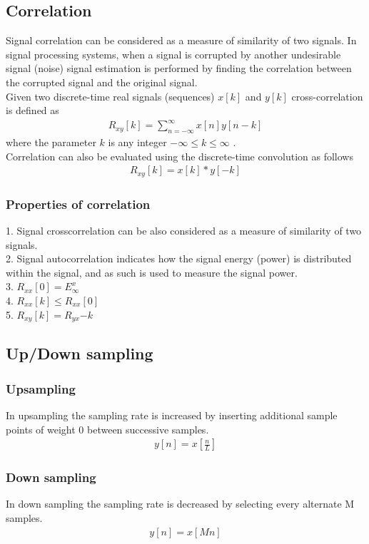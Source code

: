 \documentclass[journal,12pt,twocolumn]{IEEEtran}
\begin{document}
\subsection{Correlation}
Signal correlation can be considered as a measure of similarity of two signals. In signal processing systems, when a signal is corrupted by another undesirable signal (noise) signal estimation is performed by finding the correlation between the corrupted signal and the original signal. \\
Given two discrete-time real signals (sequences) $x[k]$ and $y[k]$ cross-correlation is defined as
\begin{align*}
	R_{xy}[k] = \sum\limits_{n=-\infty}^{\infty} x[n]y[n-k]
\end{align*}
where the parameter $k$ is any integer $-\infty \leq k \leq \infty$ .\\
Correlation can also be evaluated using the discrete-time convolution as follows 
\begin{align*}
	R_{xy}[k] = x[k]*y[-k]
\end{align*}
\subsubsection{Properties of correlation}
1. Signal crosscorrelation can be also considered as a measure of similarity of two signals.\\
2. Signal autocorrelation indicates how the signal energy (power) is distributed within the signal, and as such is used to measure the signal power.\\
3. $R_{xx}[0] = E_{\infty}^x$ \\
4. $R_{xx}[k] \leq R_{xx}[0]$ \\
5. $R_{xy}[k] = R_{yx}{-k}$
\subsection{Up/Down sampling}
\subsubsection{Upsampling}
In upsampling the sampling rate is increased by inserting additional sample points of weight 0 between successive samples.
\begin{align*}
	y[n] = x[\frac{n}{L}]
\end{align*}
\subsubsection{Down sampling} In down sampling the sampling rate is decreased by selecting every alternate M samples.
\begin{align*}
        y[n] = x[Mn]
\end{align*}
\end{document}
